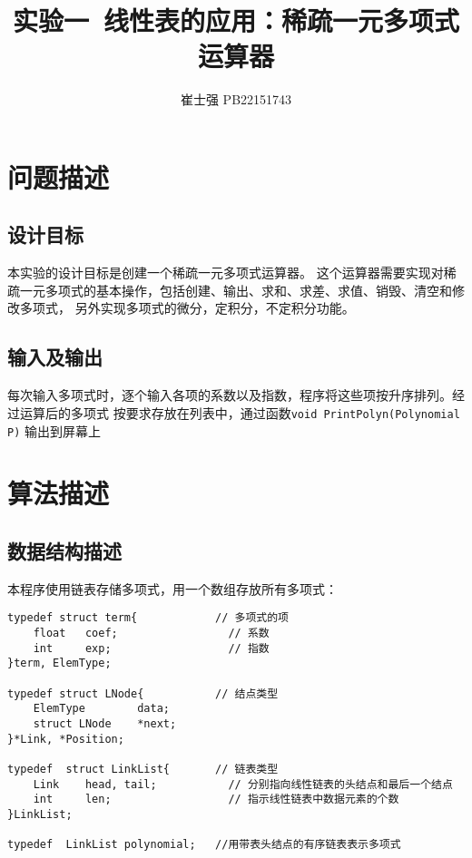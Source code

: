 \documentclass[UTF8]{ctexart}
\title{实验一\ 线性表的应用：稀疏一元多项式运算器}
\author{崔士强 PB22151743}
\date{}
\begin{document}
\maketitle

\section{问题描述}
\subsection{设计目标}
本实验的设计目标是创建一个稀疏一元多项式运算器。
这个运算器需要实现对稀疏一元多项式的基本操作，包括创建、输出、求和、求差、求值、销毁、清空和修改多项式，
另外实现多项式的微分，定积分，不定积分功能。
\subsection{输入及输出}
每次输入多项式时，逐个输入各项的系数以及指数，程序将这些项按升序排列。经过运算后的多项式
按要求存放在列表中，通过函数\lstinline|void PrintPolyn(Polynomial P)| 输出到屏幕上
\section{算法描述}
\subsection{数据结构描述}
本程序使用链表存储多项式，用一个数组存放所有多项式：
\begin{lstlisting}
typedef struct term{            // 多项式的项
    float   coef;                 // 系数
    int     exp;                  // 指数
}term, ElemType;

typedef struct LNode{           // 结点类型
    ElemType        data;
    struct LNode    *next;
}*Link, *Position;

typedef  struct LinkList{       // 链表类型
    Link    head, tail;           // 分别指向线性链表的头结点和最后一个结点
    int     len;                  // 指示线性链表中数据元素的个数
}LinkList;

typedef  LinkList polynomial;   //用带表头结点的有序链表表示多项式
\end{lstlisting}
\end{document}
